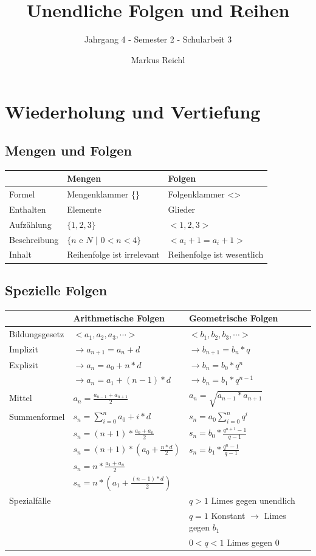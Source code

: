 \documentclass{school}
\title{Unendliche Folgen und Reihen}
\subtitle{Jahrgang 4 \-- Semester 2 \-- Schularbeit 3}
\author{Markus Reichl}
\begin{document}
\maketitle

\tableofcontents

\newpage

\section{Wiederholung und Vertiefung}
\subsection{Mengen und Folgen}
\begin{tabular}{l l l}
& \textbf{Mengen} & \textbf{Folgen}\\
\midrule
Formel & Mengenklammer \{\} & Folgenklammer <>\\
Enthalten & Elemente & Glieder\\
Aufzählung & $\{1, 2, 3\}$ & $<1, 2, 3>$\\
Beschreibung & $\{n \text{ e } N \text{ | } 0 < n < 4\}$ & $<a_i+1 = a_i + 1>$\\
Inhalt & Reihenfolge ist irrelevant & Reihenfolge ist wesentlich
\end{tabular}

\subsection{Spezielle Folgen}
\begin{tabular}{l l l}
& \textbf{Arithmetische Folgen} & \textbf{Geometrische Folgen}\\
\midrule
Bildungsgesetz & $<a_1, a_2, a_3, \cdots>$ & $<b_1, b_2, b_3, \cdots>$\\
\small{Implizit}& $\rightarrow a_{n+1} = a_n + d$ & $\rightarrow b_{n+1} = b_n * q$\\
\small{Explizit}& $\rightarrow  a_n = a_0 + n * d$ & $\rightarrow b_n = b_0 * q ^ n$\\
& $\rightarrow  a_n = a_1 + (n-1) * d$ & $\rightarrow b_n = b_1 * q^{n - 1}$\\
\midrule
Mittel & $a_n = \frac{a_{n-1} + a_{n+1}}{2}$ & $a_n = \sqrt{a_{n-1} * a_{n+1}}$ \\
\midrule
Summenformel & $s_n = \sum_{i=0}^n a_0 + i * d$ & $s_n=a_0\sum_{i=0}^{n} q^i$\\
& $s_n = (n + 1) * \frac{a_0 + a_n}{2}$ & $s_n = b_0 * \frac{q^{n + 1} - 1}{q - 1}$\\
& $s_n = (n + 1) * (a_0 + \frac{n * d}{2})$ & $s_n = b_1 * \frac{q^n - 1}{q - 1}$\\
& $s_n = n * \frac{a_1 + a_n}{2}$ &\\
& $s_n = n * (a_1 + \frac{(n - 1) * d}{2})$ &\\
\midrule
Spezialfälle & & $q > 1$ Limes gegen unendlich\\
& & $q = 1$ Konstant $\rightarrow$ Limes gegen $b_1$\\
& & $0 < q < 1$ Limes gegen 0
\end{tabular}
\end{document}
